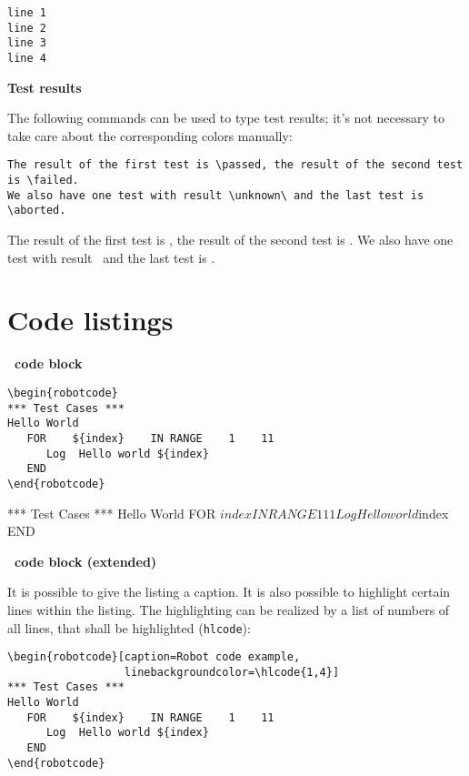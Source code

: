 \documentclass[a4paper,10pt]{report}
\begin{document}
\texttt{line 1}\\
\tab \texttt{line 2}\\
\tab \texttt{line 3}\\
\tab \texttt{line 4}\\

\vspace{2ex}

\textbf{Test results}

The following commands can be used to type test results; it's not necessary to take care about the corresponding colors manually:

\begin{verbatim}
The result of the first test is \passed, the result of the second test is \failed.
We also have one test with result \unknown\ and the last test is \aborted.
\end{verbatim}

The result of the first test is \passed, the result of the second test is \failed.
We also have one test with result \unknown\ and the last test is \aborted.

\newpage

\section{Code listings}

\textbf{\rfw\ code block}
\begin{verbatim}
\begin{robotcode}
*** Test Cases ***
Hello World
   FOR    ${index}    IN RANGE    1    11
      Log  Hello world ${index}
   END
\end{robotcode}
\end{verbatim}

\begin{robotcode}
*** Test Cases ***
Hello World
   FOR    ${index}    IN RANGE    1    11
      Log  Hello world ${index}
   END
\end{robotcode}

\vspace{2ex}

\textbf{\rfw\ code block (extended)}

It is possible to give the listing a caption. It is also possible to highlight certain lines within the listing. The highlighting can be realized by a list
of numbers of all lines, that shall be highlighted (\texttt{hlcode}):

\begin{verbatim}
\begin{robotcode}[caption=Robot code example,
                  linebackgroundcolor=\hlcode{1,4}]
*** Test Cases ***
Hello World
   FOR    ${index}    IN RANGE    1    11
      Log  Hello world ${index}
   END
\end{robotcode}
\end{verbatim}
\end{document}
